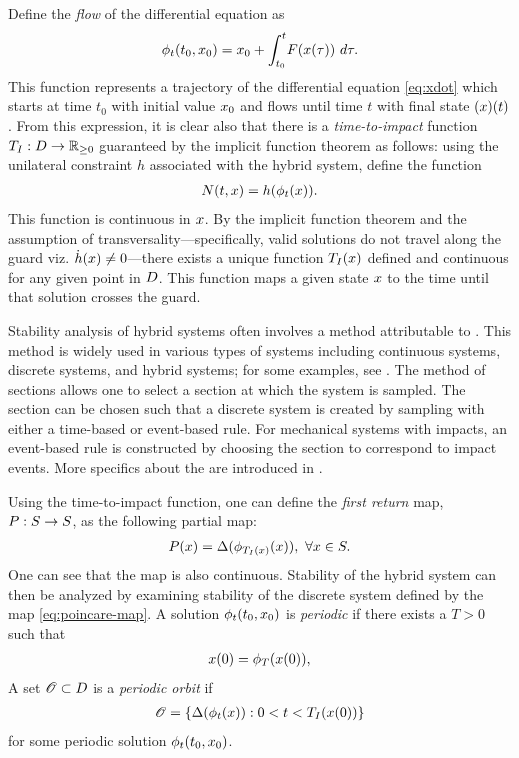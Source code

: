 Define the {\em flow} of the differential equation as
\begin{align*}
  \flowt(t_{0}, \x_{0}) = \x_{0} + \int_{t_{0}}^{t} \! \xf(\x\argtau) \ d\tau.
\end{align*}
%
This function represents a trajectory of the differential equation
\eqref{eq:xdot} which starts at time $t_{0}$ with initial value $x_{0}$ and
flows until time $t$ with final state $(x)(t)$.
%
From this expression, it is clear also that there is a {\em time-to-impact} function
$T_{I} : D \to \mathbb{R}_{\geq 0}$ guaranteed by the implicit function theorem as follows:
%
using the unilateral constraint $h$ associated with the hybrid system, define
the function
\begin{align*}
  N(t, x) = h(\phi_{t}(x)).
\end{align*}
%
This function is continuous in $x$.
%
By the implicit function theorem and the assumption of
transversality---specifically, valid solutions do not travel along the guard
viz. $\dot h(x) \ne 0$---there exists a unique function $T_{I}(x)$ defined and
continuous for any given point in $D$.
%
This function maps a given state $x$ to the time until that solution crosses
the guard.
%

Stability analysis of hybrid systems often involves a method attributable to
\Poincare{}.
%
This method is widely used in various types of systems including continuous
systems, discrete systems, and hybrid systems; for some examples, see
\cite{Guckenheimer1983, Parker1989, Perko2001, Grizzle2014}.
%
The method of \Poincare{} sections allows one to select a \Poincare{} section
at which the system is sampled.
%
The \Poincare{} section can be chosen such that a discrete system is created by
sampling with either a time-based or event-based rule.
%
For mechanical systems with impacts, an event-based rule is constructed by
choosing the \Poincare{} section to correspond to impact events.
%
More specifics about the \Poincare{} are introduced in
.

Using the time-to-impact function, one can define the {\em \Poincare{} first
  return} map, $P : S \to S$, as the following partial map:
%
\begin{align}
  \label{eq:poincare-map}
  P(x)  = \Delta(\phi_{T_{I}(x)}(x)), \ \forall x \in S.
\end{align}
%
One can see that the \Poincare{} map is also continuous.
%
Stability of the hybrid system can then be analyzed by examining stability of
the discrete system \cite{Morris2009} defined by the \Poincare{} map
\eqref{eq:poincare-map}.
%
A solution $\phi_{t}(t_{0}, x_{0})$ is {\em periodic} if there exists a $T > 0$
such that
\begin{align*}
  x(0) = \phi_{T}(x(0)),
\end{align*}
%
A set ${\mathscr O} \subset D$ is a {\em periodic orbit} if
\begin{align*}
  {\mathscr O} = \{ \Delta(\phi_{t}(x)) : 0 < t < T_{I}(x(0)) \}
\end{align*}
for some periodic solution $\phi_{t}(t_{0}, x_{0})$.

